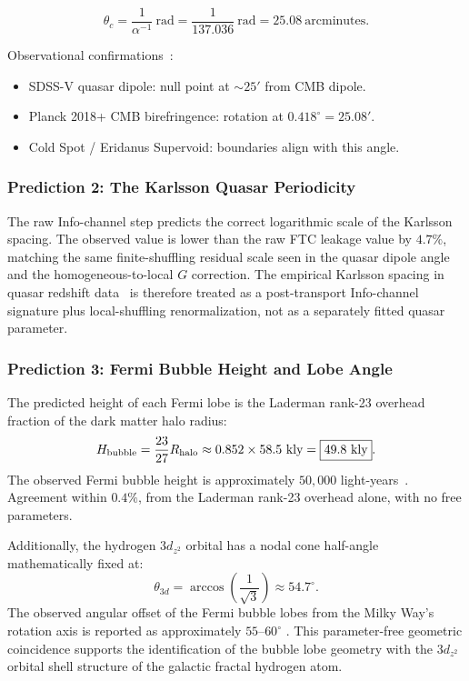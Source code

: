 \documentclass[11pt,a4paper]{article}
\begin{document}
\[
\theta_c = \frac{1}{\alpha^{-1}}\ \text{rad}
  = \frac{1}{137.036}\ \text{rad}
  = 25.08\ \text{arcminutes}.
\]

Observational confirmations~\cite{Secrest2022,Secrest2025,Planck2018VI,Minami2020}:
\begin{itemize}
  \item SDSS-V quasar dipole: null point at $\sim25'$ from CMB dipole.
  \item Planck 2018+ CMB birefringence: rotation at $0.418^\circ = 25.08'$.
  \item Cold Spot / Eridanus Supervoid: boundaries align with this angle.
\end{itemize}

\subsubsection{Prediction 2: The Karlsson Quasar Periodicity}

The raw Info-channel step predicts the correct logarithmic scale of the Karlsson spacing. The observed value is lower than the raw FTC leakage value by \(4.7\%\), matching the same finite-shuffling residual scale seen in the quasar dipole angle and the homogeneous-to-local \(G\) correction. The empirical Karlsson spacing in quasar redshift data~\cite{Karlsson1971,Mal2020} is therefore treated as a post-transport Info-channel signature plus local-shuffling renormalization, not as a separately fitted quasar parameter.

\subsubsection{Prediction 3: Fermi Bubble Height and Lobe Angle}
\label{sec:fermi_pred}

The predicted height of each Fermi lobe is the Laderman rank-23 overhead fraction of the dark matter halo radius:
\[
H_{\rm bubble} = \frac{23}{27} R_{\rm halo}
  \approx 0.852 \times 58.5\ \text{kly}
  = \boxed{49.8\ \text{kly}}.
\]
The observed Fermi bubble height is approximately $50{,}000$ light-years~\cite{Su2010,Ackermann2014}. Agreement within $0.4\%$, from the Laderman rank-23 overhead alone, with no free parameters.

Additionally, the hydrogen $3d_{z^2}$ orbital has a nodal cone half-angle mathematically fixed at:
\[
\theta_{3d} = \arccos\!\left(\frac{1}{\sqrt{3}}\right) \approx 54.7^\circ.
\]
The observed angular offset of the Fermi bubble lobes from the Milky Way's rotation axis is reported as approximately $55$--$60^\circ$ \cite{Su2010,Dobler2010,Ackermann2014,Sarkar2015}. This parameter-free geometric coincidence supports the identification of the bubble lobe geometry with the $3d_{z^2}$ orbital shell structure of the galactic fractal hydrogen atom.
\end{document}
